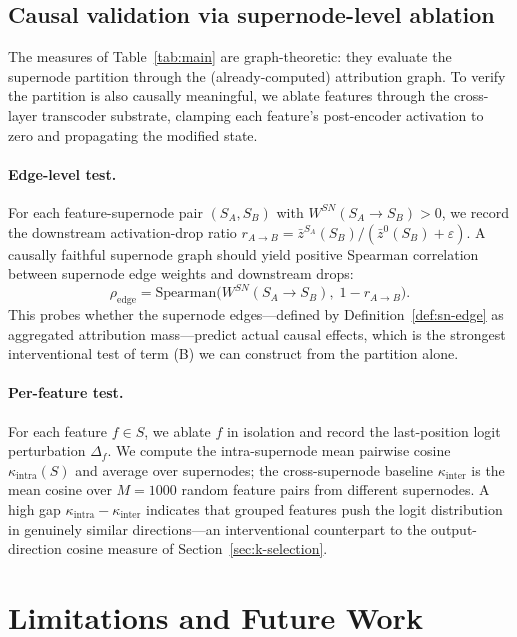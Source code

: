 \documentclass[table, 11pt]{article}
\begin{document}
\subsection{Causal validation via supernode-level ablation}

The measures of Table~\ref{tab:main} are graph-theoretic: they
evaluate the supernode partition through the (already-computed)
attribution graph. To verify the partition is also causally
meaningful, we ablate features through the cross-layer transcoder
substrate, clamping each feature's post-encoder activation to zero
and propagating the modified state.

\paragraph{Edge-level test.}
For each feature-supernode pair $(S_A, S_B)$ with
$W^{SN}(S_A \to S_B) > 0$, we record the downstream activation-drop
ratio $r_{A \to B} = \bar z^{S_A}(S_B) / (\bar z^0(S_B) + \varepsilon)$.
A causally faithful supernode graph should yield positive Spearman
correlation between supernode edge weights and downstream drops:
\begin{equation}
\rho_{\text{edge}} = \mathrm{Spearman}\bigl(W^{SN}(S_A \to S_B),\; 1 - r_{A \to B}\bigr).
\label{eq:rho-edge}
\end{equation}
This probes whether the supernode edges---defined by
Definition~\ref{def:sn-edge} as aggregated attribution mass---predict
actual causal effects, which is the strongest interventional test of
term (B) we can construct from the partition alone.

\paragraph{Per-feature test.}
For each feature $f \in S$, we ablate $f$ in isolation and record the
last-position logit perturbation $\Delta_f$. We compute the
intra-supernode mean pairwise cosine $\kappa_{\text{intra}}(S)$ and
average over supernodes; the cross-supernode baseline $\kappa_{\text{inter}}$
is the mean cosine over $M=1000$ random feature pairs from different
supernodes. A high gap $\kappa_{\text{intra}} - \kappa_{\text{inter}}$
indicates that grouped features push the logit distribution in
genuinely similar directions---an interventional counterpart to the
output-direction cosine measure of Section~\ref{sec:k-selection}.

\section{Limitations and Future Work}
\end{document}

